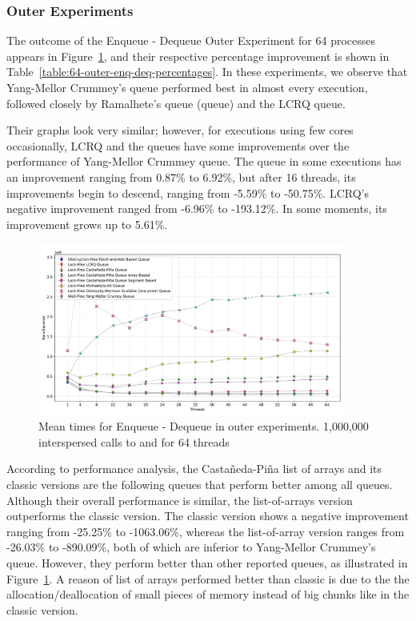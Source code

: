 %



\subsubsection{\label{subsec:outer-experiments}Outer Experiments}

The outcome of the Enqueue - Dequeue Outer Experiment for 64 processes appears in Figure~\ref{fig:64-outer--enq-deq}, and their respective percentage improvement is shown in Table~\ref{table:64-outer-enq-deq-percentages}. In these experiments, we observe that Yang-Mellor Crummey's queue performed best in almost every execution, followed closely by Ramalhete's \FAI queue (\FAI queue) and the LCRQ queue.


Their graphs look very similar; however, for executions using few cores occasionally, LCRQ and the \FAI queues have some improvements over the performance of Yang-Mellor Crummey queue. The \FAI queue in some executions has an improvement ranging from 0.87\% to 6.92\%, but after 16 threads, its improvements begin to descend, ranging from -5.59\% to -50.75\%. LCRQ's negative improvement ranged from -6.96\% to -193.12\%. In some moments, its improvement grows up to 5.61\%.


\begin{figure}[ht!]
  \centering
  \includegraphics[width=0.9\textwidth]{contents/figures/V_64_outer_enq_deq_all.pdf}
  \caption{\label{fig:64-outer--enq-deq} Mean times for Enqueue - Dequeue in outer experiments. 1,000,000 interspersed calls to \Enq and \Deq  for 64 threads}
\end{figure}

According to performance analysis, the Castañeda-Piña list of arrays and its classic versions are the following queues that perform better among all queues. Although their overall performance is similar, the list-of-arrays version outperforms the classic version. The classic version shows a negative improvement ranging from -25.25\% to -1063.06\%, whereas the list-of-array version ranges from -26.03\% to -890.09\%, both of which are inferior to Yang-Mellor Crummey's queue. However, they perform better than other reported queues, as illustrated in Figure~\ref{fig:64-outer--enq-deq}. A reason of list of arrays performed better than classic is due to the the allocation/deallocation of small pieces of memory instead of big chunks like in the classic version.


